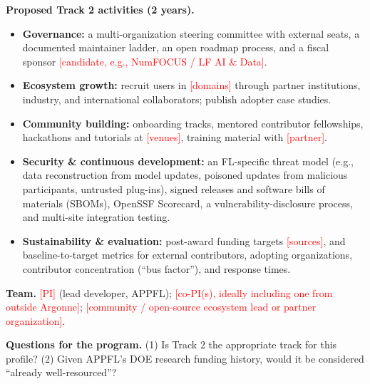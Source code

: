 \documentclass[11pt]{article}
\newcommand{\todo}[1]{\textcolor{red}{[#1]}}
\newcommand{\sect}[1]{\vspace{3pt}\textbf{#1}\quad}
\begin{document}
\sect{Proposed Track 2 activities (2 years).}
\begin{itemize}
  \item \textbf{Governance:} a multi-organization steering committee with external seats, a documented maintainer ladder, an open roadmap process, and a fiscal sponsor \todo{candidate, e.g., NumFOCUS / LF AI \& Data}.
  \item \textbf{Ecosystem growth:} recruit users in \todo{domains} through partner institutions, industry, and international collaborators; publish adopter case studies.
  \item \textbf{Community building:} onboarding tracks, mentored contributor fellowships, hackathons and tutorials at \todo{venues}, training material with \todo{partner}.
  \item \textbf{Security \& continuous development:} an FL-specific threat model (e.g., data reconstruction from model updates, poisoned updates from malicious participants, untrusted plug-ins), signed releases and software bills of materials (SBOMs), OpenSSF Scorecard, a vulnerability-disclosure process, and multi-site integration testing.
  \item \textbf{Sustainability \& evaluation:} post-award funding targets \todo{sources}, and baseline-to-target metrics for external contributors, adopting organizations, contributor concentration (``bus factor''), and response times.
\end{itemize}

\sect{Team.}
\todo{PI} (lead developer, APPFL); \todo{co-PI(s), ideally including one from outside Argonne}; \todo{community / open-source ecosystem lead or partner organization}.

\sect{Questions for the program.}
(1) Is Track 2 the appropriate track for this profile? \;
(2) Given APPFL's DOE research funding history, would it be considered ``already well-resourced''?
\end{document}
